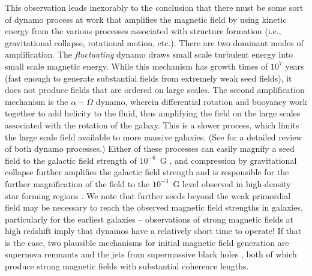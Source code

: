 This observation leads inexorably to the conclusion that there must be
some sort of dynamo process at work that amplifies the magnetic field
by using kinetic energy from the various processes associated with
structure formation (i.e., gravitational collapse, rotational motion,
etc.).  There are two dominant modes of amplification.  The
\emph{fluctuating} dynamo draws small scale turbulent energy into
small scale magnetic energy.  While this mechanism has growth times of
$10^7$ years (fast enough to generate substantial fields from
extremely weak seed fields), it does not produce fields that are
ordered on large scales.  The second amplification mechanism is the
$\alpha-\Omega$ dynamo, wherein differential rotation and buoyancy
work together to add helicity to the fluid, thus amplifying the field
on the large scales associated with the rotation of the galaxy.  This
is a slower process, which limits the large scale field available to
more massive galaxies.  (See \cite{Brandenburg05} for a detailed
review of both dynamo processes.)  Either of these processes can
easily magnify a seed field to the galactic field
strength of $10^{-6}$~G \cite{Beck13}, and compression by
gravitational collapse further amplifies the galactic field strength
and is responsible for the further magnification of the field to the
$10^{-3}$~G level observed in high-density star forming regions
\cite{Collins11}.  We note that further seeds beyond the weak
primordial field may be necessary to reach the observed magnetic field
strengths in galaxies, particularly for the earliest galaxies --
observations of strong magnetic fields at high redshift imply that
dynamos have a relatively short time to operate!  If that is the case,
two plausible mechanisms for initial magnetic field generation are supernova
remnants \cite{2002RvMP...74..775W} and the jets from supermassive
black holes \cite{1969Natur.223..936H, 1990ApJ...364..451D}, both of
which produce strong magnetic fields with substantial coherence
lengths.

